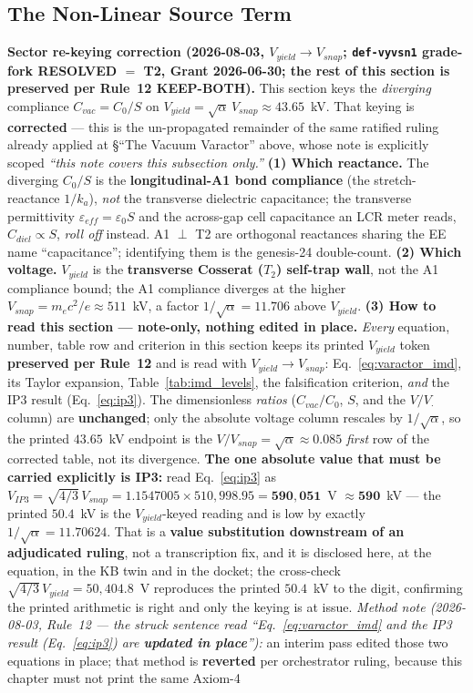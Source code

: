 \subsection{The Non-Linear Source Term}

\noindent\textbf{Sector re-keying correction (2026-08-03, $V_{yield} \to V_{snap}$; \texttt{def-vyvsn1} grade-fork RESOLVED $=$ T2, Grant 2026-06-30; the rest of this section is preserved per Rule~12 KEEP-BOTH).} This section keys the \emph{diverging} compliance $C_{vac} = C_0/S$ on $V_{yield} = \sqrt{\alpha}\,V_{snap} \approx 43.65$~kV. That keying is \textbf{corrected} --- this is the un-propagated remainder of the same ratified ruling already applied at \S``The Vacuum Varactor'' above, whose note is explicitly scoped \emph{``this note covers this subsection only.''} \textbf{(1) Which reactance.} The diverging $C_0/S$ is the \textbf{longitudinal-A1 bond compliance} (the stretch-reactance $1/k_a$), \emph{not} the transverse dielectric capacitance; the transverse permittivity $\varepsilon_{eff} = \varepsilon_0 S$ and the across-gap cell capacitance an LCR meter reads, $C_{diel} \propto S$, \emph{roll off} instead. A1 $\perp$ T2 are orthogonal reactances sharing the EE name ``capacitance''; identifying them is the genesis-24 double-count. \textbf{(2) Which voltage.} $V_{yield}$ is the \textbf{transverse Cosserat ($T_2$) self-trap wall}, not the A1 compliance bound; the A1 compliance diverges at the higher $V_{snap} = m_ec^2/e \approx 511$~kV, a factor $1/\sqrt{\alpha} = 11.706$ above $V_{yield}$. \textbf{(3) How to read this section --- note-only, nothing edited in place.} \emph{Every} equation, number, table row and criterion in this section keeps its printed $V_{yield}$ token \textbf{preserved per Rule~12} and is read with $V_{yield} \to V_{snap}$: Eq.~\ref{eq:varactor_imd}, its Taylor expansion, Table~\ref{tab:imd_levels}, the falsification criterion, \emph{and} the IP3 result (Eq.~\ref{eq:ip3}). The dimensionless \emph{ratios} ($C_{vac}/C_0$, $S$, and the $V/V_{\cdot}$ column) are \textbf{unchanged}; only the absolute voltage column rescales by $1/\sqrt{\alpha}$, so the printed $43.65$~kV endpoint is the $V/V_{snap} = \sqrt{\alpha} \approx 0.085$ \emph{first} row of the corrected table, not its divergence. \textbf{The one absolute value that must be carried explicitly is IP3:} read Eq.~\ref{eq:ip3} as $V_{IP3} = \sqrt{4/3}\,V_{snap} = 1.1547005 \times 510{,}998.95 = \mathbf{590{,}051}$~V $\approx \mathbf{590}$~kV --- the printed $50.4$~kV is the $V_{yield}$-keyed reading and is low by exactly $1/\sqrt{\alpha} = 11.70624$. That is a \textbf{value substitution downstream of an adjudicated ruling}, not a transcription fix, and it is disclosed here, at the equation, in the KB twin and in the docket; the cross-check $\sqrt{4/3}\,V_{yield} = 50{,}404.8$~V reproduces the printed $50.4$~kV to the digit, confirming the printed arithmetic is right and only the keying is at issue. \emph{Method note (2026-08-03, Rule~12 --- the struck sentence read ``Eq.~\ref{eq:varactor_imd} and the IP3 result (Eq.~\ref{eq:ip3}) are \textbf{updated in place}''):} an interim pass edited those two equations in place; that method is \textbf{reverted} per orchestrator ruling, because this chapter must not print the same Axiom-4 